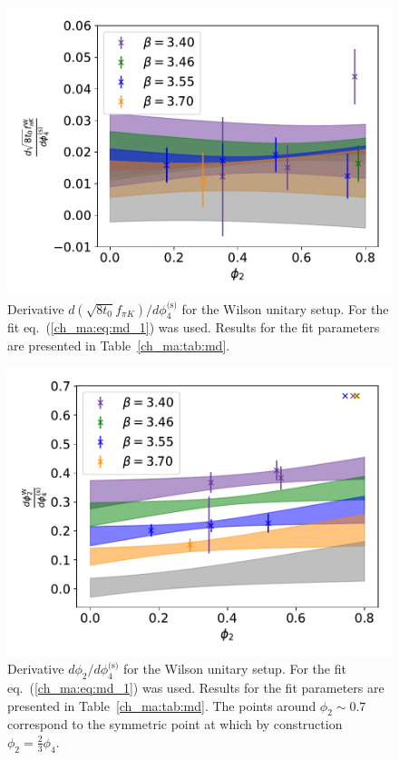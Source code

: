 \begin{figure}
    \centering
    \includegraphics[width=1.\textwidth]{./cap4/figs/der_t0fpik.pdf}
    \caption{Derivative $d\left(\sqrt{8t_0}f_{\pi K}\right)/d\phi_4^{\textrm{(s)}}$ for the Wilson unitary setup. For the fit eq.~(\ref{ch_ma:eq:md_1}) was used. Results for the fit parameters are presented in Table~\ref{ch_ma:tab:md}.}
    \label{ch_ma:fig:dfpik_w}
\end{figure}

\begin{figure}
    \centering
    \includegraphics[width=1.\textwidth]{./cap4/figs/der_phi2.pdf}
    \caption{Derivative $d\phi_2/d\phi_4^{\textrm{(s)}}$ for the Wilson unitary setup. For the fit eq.~(\ref{ch_ma:eq:md_1}) was used. Results for the fit parameters are presented in Table~\ref{ch_ma:tab:md}. The points around $\phi_2\sim0.7$ correspond to the symmetric point at which by construction $\phi_2=\frac{2}{3}\phi_4$.}
    \label{ch_ma:fig:dphi2_w}
\end{figure}

